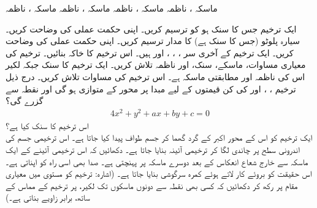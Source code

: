 ماسکہ ، ناظمہ 
ماسکہ ، ناظمہ 
ماسکہ ، ناظمہ 
ماسکہ ، ناظمہ 

ایک ترخیم جس کا  سنک  ہو کو ترسیم کریں۔ اپنی حکمت عملی کی وضاحت  کریں۔
سیارہ پلوٹو (جس کا سنک  ہے) کا مدار ترسیم کریں۔  اپنی حکمت عملی کی وضاحت  کریں۔
ایک ترخیم کے آخری سر ، ، ،  اور  ہیں۔ اس ترخیم کا خاکہ بنائیں۔ ترخیم کی معیاری مساوات، ماسکے، سنک،  اور ناظمہ تلاش کریں۔
ایک ترخیم کا  سنک   جبکہ لکیر  اس کی ناظمہ اور  مطابقتی ماسکہ ہے۔ اس ترخیم کی مساوات تلاش کریں۔
درج ذیل ترخیم ، ،  اور  کی کن قیمتوں کے لیے مبدا پر محور  کے متوازی ہو گی  اور نقطہ  سے گزرے گی؟
\begin{align*}
4x^2+y^2+ax+by+c=0
\end{align*}
اس ترخیم کا سنک  کیا ہے؟
\\
 ایک ترخیم کو اس کے محور اکبر کے گرد گھما کر جسم طواف پیدا کیا جاتا ہے۔ اس ترخیمی جسم کی اندرونی سطح پر چاندی لگا کر ترخیمی آئینہ بنایا جاتا ہے۔ دکھائیں کہ اس ترخیمی آئینے کے ایک ماسکہ سے خارج شعاع انعکاس کے بعد دوسرے ماسکہ پر پہنچتی ہے۔ صدا بھی اسی راہ کو اپناتی  ہے۔ اس حقیقت کو بروئے کار لاتے ہوئے کمرہ سرگوشی بنایا جاتا ہے۔ (اشارہ: ترخیم کو مستوی   میں  معیاری مقام پر رکھ کر دکھائیں کہ کسی بھی نقطہ  سے دونوں ماسکوں تک لکیر،  پر ترخیم کے مماس کے ساتھ،  برابر    زاویے بناتی  ہے۔)

